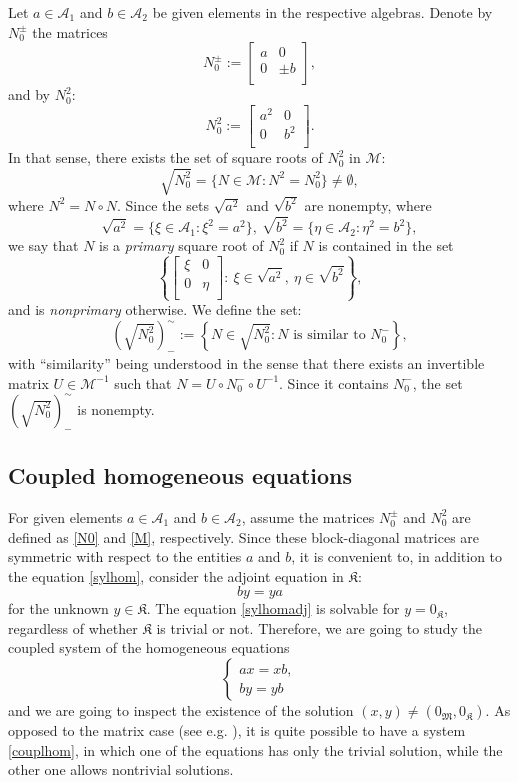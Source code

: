 \documentclass{article}
\theoremstyle{definition}
\def\A{{\mathcal{A}}}
\def\M{\mathfrak{M}}
\def\K{\mathfrak{K}}
\newcommand{\mat}[4]{\left[\begin{array}{cc}#1 & #2 \\ #3 & #4 \\
	\end{array}\right]}
\begin{document}
Let $a\in\A_1$ and $b\in\A_2$ be given elements in the respective algebras. Denote by $N_0^\pm$ the matrices
\begin{equation}\label{N0}
N^{\pm}_0:=\mat{a}{0}{0}{\pm b},
\end{equation}
and by $N_0^2$:
\begin{equation}
\label{M}N_0^2:=\mat{a^2}{0}{0}{b^2}.\end{equation}
In that sense, there exists the set of square roots of $N_0^2$ in $\mathcal{M}$:
\begin{equation}\label{sqrtM}\sqrt{N_0^2}=\{N\in\mathcal{M}: N^2=N_0^2\}\neq\emptyset,\end{equation}
where $N^2=N\circ N$. 
Since the sets $\sqrt{a^2}$ and $\sqrt{b^2}$ are nonempty, where
$$\sqrt{a^2}=\{\xi\in\A_1: \xi^2=a^2\},\ \sqrt{b^2}=\{\eta\in\A_2: \eta^2=b^2\},$$
we say that $N$ is a \emph{primary} square root of $N_0^2$ if $N$ is contained in the set
$$\left\{\mat{\xi}{0}{0}{\eta}:\  \xi\in\sqrt{a^2}, \ \eta\in\sqrt{b^2}\right\},$$
and is \emph{nonprimary} otherwise. We define the set:
\begin{equation}
\label{sqrtM'}\left(\sqrt{N_0^2}\right)^{\sim}_{-}:=\left\{N\in\sqrt{N_0^2}: N\textrm{ is similar to }N_0^-\right\},
\end{equation}
with ``similarity'' being understood in the sense that there exists an invertible matrix $U\in\mathcal{M}^{-1}$ such that 
$N=U\circ N_0^- \circ U^{-1}$. Since it contains $N^{-}_0$, the set $\left(\sqrt{N_0^2}\right)^{\sim}_{-}$ is nonempty. 



\subsection{Coupled homogeneous equations}

For given elements $a\in\A_1$ and $b\in\A_2$, assume the matrices $N_0^\pm$ and $N_0^2$ are defined as \eqref{N0} and \eqref{M}, respectively. Since these block-diagonal matrices are symmetric with respect to the entities $a$ and $b$, it is convenient to, in addition to the equation \eqref{sylhom}, consider the adjoint equation in $\K$:
 \begin{equation}\label{sylhomadj}
 by=ya
 \end{equation}
 for the unknown $y\in\K$. The equation \eqref{sylhomadj} is solvable for $y=0_\mathfrak{K}$, regardless of whether $\K$ is trivial or not. Therefore, we are going to study the coupled system of the homogeneous equations
  \begin{equation}
  \label{couplhom}
  \begin{cases} ax=xb,\\by=yb
  \end{cases}
  \end{equation}
  and we are going to inspect the existence of the solution $(x,y)\neq(0_\M,0_\K)$. As opposed to the matrix case (see e.g. \cite{MD}), it is quite possible to have a system \eqref{couplhom}, in which one of the equations has only the trivial solution, while the other one allows nontrivial solutions. 
 
\end{document}
